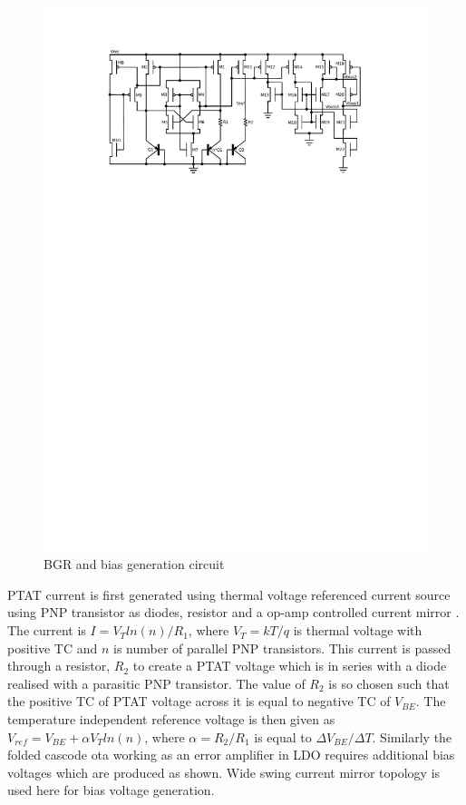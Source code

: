 \documentclass[12pt,a4paper,UKenglish]{article}
\begin{document}
\begin{figure}[htbp] %
   \centering
   \includegraphics[width=\textwidth]{img/sch_bgr.pdf} 
   \caption{BGR and bias generation circuit}
   \label{bgr_sch}
\end{figure}

PTAT current is first generated using thermal voltage referenced current source using PNP transistor as diodes, resistor and a op-amp controlled current mirror \cite[pp. 391-392]{razavi_2001}. The current is $I = V_T ln(n)/R_1$, where $V_T = kT/q $ is thermal voltage with positive TC and $n$ is number of parallel PNP transistors. This current is passed through a resistor, $R_2$ to create a PTAT voltage which is in series with a diode realised with a parasitic PNP transistor. The value of $R_2$ is so chosen such that the positive TC of PTAT voltage across it is equal to negative TC of $V_{BE}$. The temperature independent reference voltage is then given as $V_{ref}  = V_{BE} + \alpha V_T ln(n)$, where $ \alpha = R_2/R_1$ is equal to $  \Delta V_{BE}/\Delta T$. Similarly the folded cascode  \gls{ota} working as an error amplifier in LDO requires additional bias voltages which are produced as shown. Wide swing current mirror topology is used here for bias voltage generation.\\
\end{document}
